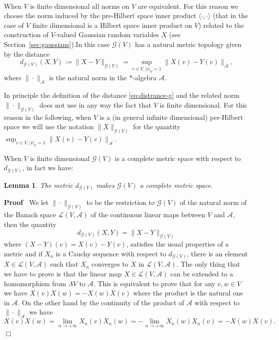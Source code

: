 \documentclass{article}
\newcommand{\assign}{:=}
\newcommand{\asterisk}{\mathord{*}}
\newenvironment{proof}{\noindent\textbf{Proof\ }}{\hspace*{\fill}$\Box$\medskip}
\newtheorem{lemma}[theorem]{Lemma}
\begin{document}
\

When $V$ is finite dimensional all norms on $V$ are equivalent. For this
reason we choose the norm induced by the pre-Hilbert space inner product
$\langle \cdot, \cdot \rangle$ (that in the case of $V$ finite dimensional is
a Hilbert space inner product on $V$) related to the construction of
$V$-valued Gaussian random variables $X$ (see
Section~\ref{sec:gaussians}).\quad In this case $\mathcal{G} (V)$ has a
natural metric topology given by the distance
\begin{equation}
  d_{\mathcal{G} (V)} (X, Y) \assign \| X - Y \|_{\mathcal{G} (V)} = \sup_{v
  \in V, | v |_V = 1} \| X (v) - Y (v) \|_{\mathcal{A}},
  \label{eq:distrance-g}
\end{equation}
where $\| \cdot \|_{\mathcal{A}}$ is the natural norm in the
$\asterisk$-algebra $\mathcal{A}$.

\begin{remark}
  \label{remark_infinitenorm}In principle the definition of the distance
  {\eqref{eq:distrance-g}} and the related norm $\| \cdot \|_{\mathcal{G}
  (V)}$ does not use in any way the fact that $V$ is finite dimensional. For
  this reason in the following, when $V$ is a (in general infinite
  dimensional) per-Hilbert space we will use the notation $\| X
  \|_{\mathcal{G} (V)}$ for the quantity $\sup_{v \in V, | v |_V = 1} \| X (v)
  - Y (v) \|_{\mathcal{A}}$.
\end{remark}

When $V$ is finite dimensional $\mathcal{G} (V)$ is a complete metric space
with respect to $d_{\mathcal{G} (V)}$, in fact we have:

\begin{lemma}
  \label{lemma_completeness}The metric $d_{\mathcal{G} (V)}$ makes
  $\mathcal{G} (V)$ a complete metric space.
\end{lemma}

\begin{proof}
  We let $\| \cdot \|_{\mathcal{G} (V)}$ to be the restriction to $\mathcal{G}
  (V)$ of the natural norm of the Banach space $\mathcal{L} (V, \mathcal{A})$
  of the continuous linear maps between $V$ and $\mathcal{A}$, then the
  quantity
  \[ d_{\mathcal{G} (V)} (X, Y) = \| X - Y \|_{\mathcal{G} (V)} \]
  where $(X - Y) (v) = X (v) - Y (v)$, satisfies the usual properties of a
  metric and if $X_n$ is a Cauchy sequence with respect to $d_{\mathcal{G}
  (V)}$, there is an element $X \in \mathcal{L} (V, \mathcal{A})$ such that
  $X_n$ converges to $X$ in $\mathcal{L} (V, \mathcal{A})$. The only thing
  that we have to prove is that the linear map $X \in \mathcal{L} (V,
  \mathcal{A})$ can be extended to a homomorphism from $\Lambda V$ to
  $\mathcal{A}$. This is equivalent to prove that for any $v, w \in V$ we have
  $X (v) X (w) = - X (w) X (v)$ where the product is the natural one in
  $\mathcal{A}$. On the other hand by the continuity of the product of
  $\mathcal{A}$ with respect to $\| \cdot \|_{\mathcal{A}}$ we have
  \[ X (v) X (w) = \lim_{n \rightarrow + \infty} X_n (v) X_n (w) = - \lim_{n
     \rightarrow + \infty} X_n (w) X_n (v) = - X (w) X (v) . \]
\end{proof}
\end{document}
